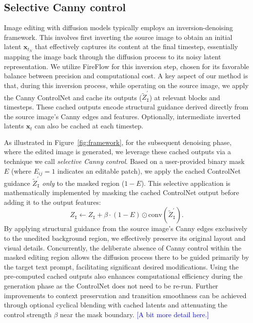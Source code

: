 \documentclass{article}
\newcommand{\kc}[1]{\textcolor{blue}{#1}}
\begin{document}
\subsection{Selective Canny control}

Image editing with diffusion models typically employs an inversion-denoising framework. This involves first inverting the source image to obtain an initial latent $\mathbf{x}_{t_N}$ that effectively captures its content at the final timestep, essentially mapping the image back through the diffusion process to its noisy latent representation. We utilize FireFlow \citep{deng2024fireflow} for this inversion step, chosen for its favorable balance between precision and computational cost. A key aspect of our method is that, during this inversion process, while operating on the source image, we apply the Canny ControlNet and cache its outputs ($\tilde{Z}^{\prime}_{\texttt{I}}$) at relevant blocks and timesteps. These cached outputs encode structural guidance derived directly from the source image's Canny edges and features. Optionally, intermediate inverted latents $\mathbf{x}_t$ can also be cached at each timestep.

As illustrated in Figure~\ref{fig:framework}, for the subsequent denoising phase, where the edited image is generated, we leverage these cached outputs via a technique we call \emph{selective Canny control}. Based on a user-provided binary mask $E$ (where $E_{ij}=1$ indicates an editable patch), we apply the cached ControlNet guidance $\tilde{Z}^{\prime}_{\texttt{I}}$ \emph{only} to the masked region ($1-E$). This selective application is mathematically implemented by masking the cached ControlNet output before adding it to the output features:
\begin{equation}
    Z_{\texttt{I}} \gets Z_{\texttt{I}} + \beta\cdot (1-E) \odot \mathrm{conv}(\tilde{Z}^{\prime}_{\texttt{I}}). \label{eq:tweak}
\end{equation}
By applying structural guidance from the source image's Canny edges exclusively to the unedited background region, we effectively preserve its original layout and visual details. Concurrently, the deliberate absence of Canny control within the masked editing region allows the diffusion process there to be guided primarily by the target text prompt, facilitating significant desired modifications. Using the pre-computed cached outputs also enhances computational efficiency during the generation phase as the ControlNet does not need to be re-run. Further improvements to context preservation and transition smoothness can be achieved through optional cyclical blending with cached latents and attenuating the control strength $\beta$ near the mask boundary. \kc{[A bit more detail here.]}
\end{document}
